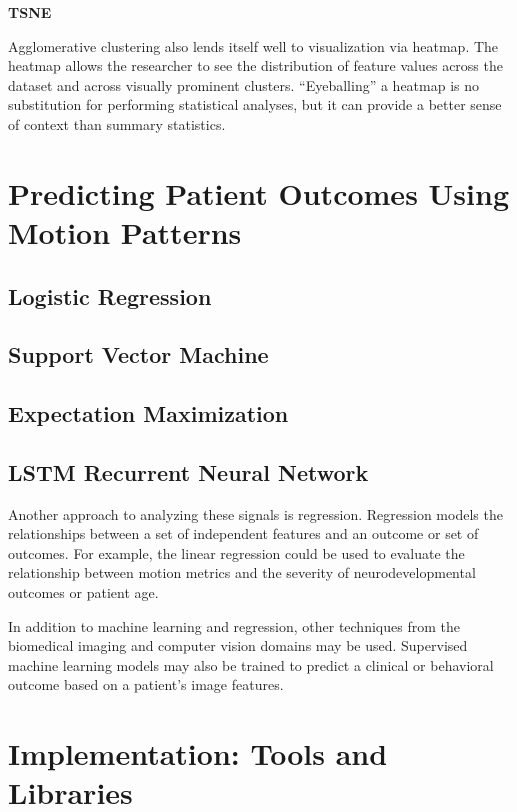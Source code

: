 \textbf{TSNE}

Agglomerative clustering also lends itself well to visualization via heatmap. The heatmap allows the researcher to see the distribution of feature values across the dataset and across visually prominent clusters. ``Eyeballing'' a heatmap is no substitution for performing statistical analyses, but it can provide a better sense of context than summary statistics.  

\section{Predicting Patient Outcomes Using Motion Patterns}

\subsection{Logistic Regression}

\subsection{Support Vector Machine}

\subsection{Expectation Maximization}

\subsection{LSTM Recurrent Neural Network}

Another approach to analyzing these signals is regression. Regression models the relationships between a set of independent features and an outcome or set of outcomes. For example, the linear regression could be used to evaluate the relationship between motion metrics and the severity of neurodevelopmental outcomes or patient age. 

In addition to machine learning and regression, other techniques from the biomedical imaging and computer vision domains may be used. Supervised machine learning models may also be trained to predict a clinical or behavioral outcome based on a patient's image features.

\section{Implementation: Tools and Libraries}

